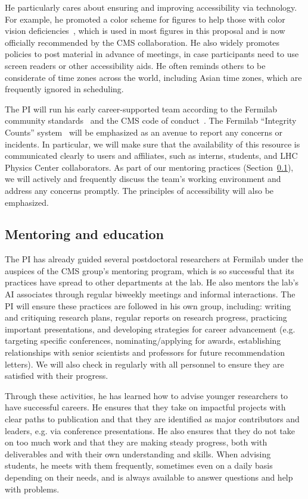 He particularly cares about ensuring and improving accessibility via technology.
For example, he promoted a color scheme for figures to help those with color vision deficiencies~\cite{Petroff:2021},
which is used in most figures in this proposal and is now officially recommended by the CMS collaboration.
He also widely promotes policies to post material in advance of meetings,
in case participants need to use screen readers or other accessibility aids.
He often reminds others to be considerate of time zones across the world,
including Asian time zones, which are frequently ignored in scheduling.

The PI will run his early career-supported team according to the Fermilab community standards~\cite{CommunityStandards} and the CMS code of conduct~\cite{CodeOfConduct}.
The Fermilab ``Integrity Counts'' system~\cite{ConcernsReporting} will be emphasized as an avenue to report any concerns or incidents.
In particular, we will make sure that the availability of this resource is communicated clearly
to users and affiliates, such as interns, students, and LHC Physics Center collaborators.
As part of our mentoring practices (Section~\ref{subsec:mentor}),
we will actively and frequently discuss the team's working environment and address any concerns promptly.
The principles of accessibility will also be emphasized.

\subsection{Mentoring and education}\label{subsec:mentor}

The PI has already guided several postdoctoral researchers at Fermilab
under the auspices of the CMS group's mentoring program,
which is so successful that its practices have spread to other departments at the lab.
He also mentors the lab's AI associates through regular biweekly meetings and informal interactions.
The PI will ensure these practices are followed in his own group, including:
writing and critiquing research plans, regular reports on research progress, practicing important presentations,
and developing strategies for career advancement (e.g. targeting specific conferences, nominating/applying for awards,
establishing relationships with senior scientists and professors for future recommendation letters).
We will also check in regularly with all personnel to ensure they are satisfied with their progress.

Through these activities, he has learned how to advise younger researchers to have successful careers.
He ensures that they take on impactful projects with clear paths to publication
and that they are identified as major contributors and leaders, e.g. via conference presentations.
He also ensures that they do not take on too much work and that they are making steady progress,
both with deliverables and with their own understanding and skills.
When advising students, he meets with them frequently, sometimes even on a daily basis depending on their needs,
and is always available to answer questions and help with problems.

